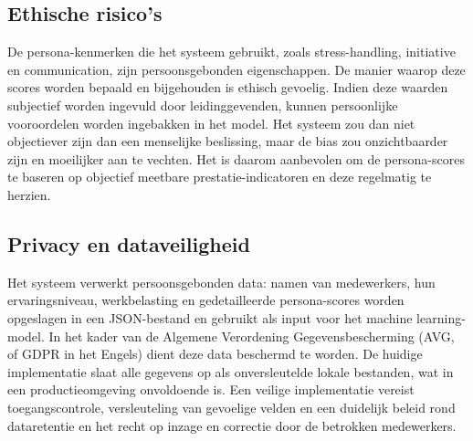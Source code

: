
\subsection{Ethische risico's}
De persona-kenmerken die het systeem gebruikt, zoals stress-handling, initiative en communication, zijn persoonsgebonden eigenschappen. De manier waarop deze scores worden bepaald en bijgehouden is ethisch gevoelig. Indien deze waarden subjectief worden ingevuld door leidinggevenden, kunnen persoonlijke vooroordelen worden ingebakken in het model. Het systeem zou dan niet objectiever zijn dan een menselijke beslissing, maar de bias zou onzichtbaarder zijn en moeilijker aan te vechten. Het is daarom aanbevolen om de persona-scores te baseren op objectief meetbare prestatie-indicatoren en deze regelmatig te herzien.


\subsection{Privacy en dataveiligheid}
Het systeem verwerkt persoonsgebonden data: namen van medewerkers, hun ervaringsniveau, werkbelasting en gedetailleerde persona-scores worden opgeslagen in een JSON-bestand en gebruikt als input voor het machine learning-model. In het kader van de Algemene Verordening Gegevensbescherming (AVG, of GDPR in het Engels) dient deze data beschermd te worden. De huidige implementatie slaat alle gegevens op als onversleutelde lokale bestanden, wat in een productieomgeving onvoldoende is. Een veilige implementatie vereist toegangscontrole, versleuteling van gevoelige velden en een duidelijk beleid rond dataretentie en het recht op inzage en correctie door de betrokken medewerkers.

